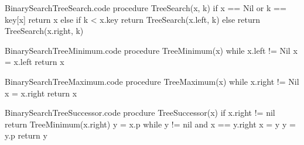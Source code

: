 \documentclass[a4paper]{article}
\begin{document}
\begin{filecontents*}[overwrite]{BinarySearchTreeSearch.code}
procedure TreeSearch(x, k)
    if x == Nil or k == key[x]
        return x
    else if k < x.key
        return TreeSearch(x.left, k)
    else
        return TreeSearch(x.right, k)
\end{filecontents*}



\begin{filecontents*}[overwrite]{BinarySearchTreeMinimum.code}
procedure TreeMinimum(x)
    while x.left != Nil
        x = x.left
    return x
\end{filecontents*}

\begin{filecontents*}[overwrite]{BinarySearchTreeMaximum.code}
procedure TreeMaximum(x)
    while x.right != Nil
        x = x.right
    return x
\end{filecontents*}


\begin{filecontents*}[overwrite]{BinarySearchTreeSuccessor.code}
procdure TreeSuccessor(x)
    if x.right != nil
        return TreeMinimum(x.right)
    y = x.p
    while y != nil and x == y.right
        x = y
        y = y.p
    return y
\end{filecontents*}
\end{document}
